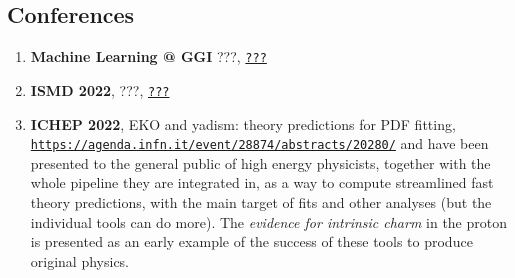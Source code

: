 \documentclass[10pt, a4paper, sans]{moderncv}
\newcommand{\tturl}[1]{\texttt{\url{#1}}}
\begin{document}
\begin{multicols}{2}
\columnbreak

\section{Conferences}

\begin{enumerate}
    \item \textbf{Machine Learning @ GGI}
      ???,
      \tturl{???}
    \item \textbf{ISMD 2022},
      ???,
      \tturl{???}
    \item \textbf{ICHEP 2022}, 
      EKO and yadism: theory predictions for PDF fitting,
      \tturl{https://agenda.infn.it/event/28874/abstracts/20280/}
      \newline
      \eko and \yadism have been presented to the general public of high energy
      physicists, together with the whole pipeline they are integrated in, as a
      way to compute streamlined fast theory predictions, with the main target
      of \pdf fits and other analyses (but the individual tools can do more).
      The \textit{evidence for intrinsic charm} in the proton is presented as
      an early example of the success of these tools to produce original
      physics.
\end{enumerate}

\end{multicols}
\end{document}
